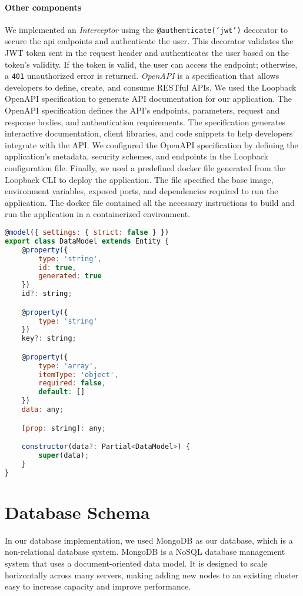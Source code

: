 \paragraph{Other components}
We implemented an \textit{Interceptor} using the \texttt{@authenticate(`jwt')} decorator to secure the \ac{api} endpoints and authenticate the user. 
This decorator validates the JWT token sent in the request header and authenticates the user based on the token's validity. 
If the token is valid, the user can access the endpoint; otherwise, a \texttt{401} unauthorized error is returned.
\textit{OpenAPI} is a specification that allows developers to define, create, and consume RESTful APIs. 
We used the Loopback OpenAPI specification to generate API documentation for our application. 
The OpenAPI specification defines the API's endpoints, parameters, request and response bodies, and authentication requirements. 
The specification generates interactive documentation, client libraries, and code snippets to help developers integrate with the API. 
We configured the OpenAPI specification by defining the application's metadata, security schemes, and endpoints in the Loopback configuration file.
Finally, we used a predefined docker file generated from the Loopback CLI to deploy the application. 
The file specified the base image, environment variables, exposed ports, and dependencies required to run the application. 
The docker file contained all the necessary instructions to build and run the application in a containerized environment.

\begin{lstlisting}[language=JavaScript, caption=The Typescript File for the Data Model, label=listing:implementation:datamodel]
@model({ settings: { strict: false } })
export class DataModel extends Entity {
    @property({
        type: 'string',
        id: true,
        generated: true
    })
    id?: string;

    @property({
        type: 'string'
    })
    key?: string;

    @property({
        type: 'array',
        itemType: 'object',
        required: false,
        default: []
    })
    data: any;

    [prop: string]: any;

    constructor(data?: Partial<DataModel>) {
        super(data);
    }
}
\end{lstlisting}
\clearpage

\section{Database Schema}
\label{implementation:section:database}
In our database implementation, we used MongoDB as our database, which is a non-relational database system. 
MongoDB is a NoSQL database management system that uses a document-oriented data model. It is designed to scale horizontally across many servers, making adding new nodes to an existing cluster easy to increase capacity and improve performance.

